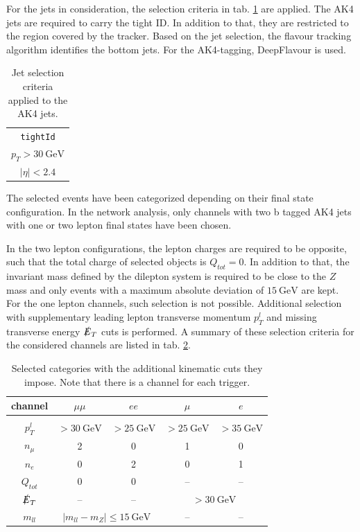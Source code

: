 For the jets in consideration, the selection criteria in tab. \ref{tab:jet_selection} are applied. The AK4 jets are required to carry the tight ID. In addition to that, they are restricted to the region covered by the tracker. Based on the jet selection, the flavour tracking algorithm identifies the bottom jets. For the AK4-tagging, DeepFlavour is used.

\begin{table}[h!]
	\centering
	\begin{tabular}{c}
		\hline
		\texttt{tightId} \\
		$p_T > \SI{30}{\giga\electronvolt}$ \\
		$|\eta| < 2.4$ \\
		\hline
	\end{tabular}
	\caption{Jet selection criteria applied to the AK4 jets.}
	\label{tab:jet_selection}
\end{table}


The selected events have been categorized depending on their final state configuration. In the network analysis, only channels with two b tagged AK4 jets with one or two lepton final states have been chosen.

In the two lepton configurations, the lepton charges are required to be opposite, such that the total charge of selected objects is $Q_{tot} = 0$. In addition to that, the invariant mass defined by the dilepton system is required to be close to the $Z$ mass and only events with a maximum absolute deviation of $\SI{15}{\giga\electronvolt}$ are kept. For the one lepton channels, such selection is not possible. Additional selection with supplementary leading lepton transverse momentum $p^l_T$ and missing transverse energy $\slashed{E}_T$ cuts is performed. A summary of these selection criteria for the considered channels are listed in tab. \ref{tab:categories}.


\begin{table}[h!]
	\centering
	\begin{tabular}{ccccc}
		channel & $\mu\mu$ & $ee$ & $\mu$ & $e$ \\
		\hline \\
		$p^l_T$ & $>\SI{30}{\giga\electronvolt}$ & $>\SI{25}{\giga\electronvolt}$ & $>\SI{25}{\giga\electronvolt}$ & $>\SI{35}{\giga\electronvolt}$ \\
		$n_\mu$ & 2 & 0 & 1 & 0 \\
		$n_e$ & 0 & 2 & 0 & 1 \\
		$Q_{tot}$ & 0 & 0 & -- & -- \\
		$\slashed{E}_T$ & -- & -- & \multicolumn{2}{c}{$>\SI{30}{\giga\electronvolt}$}  \\
		$m_{ll}$ & \multicolumn{2}{c}{$|m_{ll}-m_Z|\leq\SI{15}{\giga\electronvolt}$} & -- & -- \\
	\end{tabular}
	\caption{Selected categories with the additional kinematic cuts they impose. Note that there is a channel for each trigger.}
	\label{tab:categories}
\end{table}

